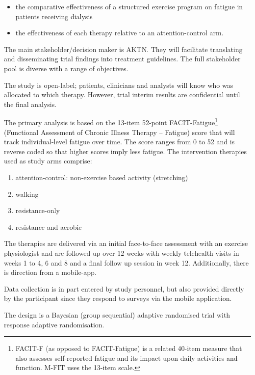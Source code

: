 \documentclass[11pt,parskip=half-]{scrartcl}
\providecommand{\tightlist}{%
  \setlength{\itemsep}{0pt}\setlength{\parskip}{0pt}}
\begin{document}
\begin{itemize}\tightlist
  \item the comparative effectiveness of a structured exercise program on fatigue in patients receiving dialysis
  \item the effectiveness of each therapy relative to an attention-control arm.
\end{itemize}

The main stakeholder/decision maker is AKTN. They will facilitate translating and disseminating trial findings into treatment guidelines. The full stakeholder pool is diverse with a range of objectives.

The study is open-label; patients, clinicians and analysts will know who was allocated to which therapy. However, trial interim results are confidential until the final analysis.

The primary analysis is based on the 13-item 52-point FACIT-Fatigue\footnote{FACIT-F (as opposed to FACIT-Fatigue) is a related 40-item measure that also assesses self-reported fatigue and its impact upon daily activities and function. M-FIT uses the 13-item scale.} (Functional Assessment of Chronic Illness Therapy – Fatigue) score that will track individual-level fatigue over time. The score ranges from 0 to 52 and is reverse coded so that higher scores imply less fatigue. The intervention therapies used as study arms comprise:

\begin{enumerate}\tightlist
  \item attention-control: non-exercise based activity (stretching)
  \item walking
  \item resistance-only
  \item resistance and aerobic
\end{enumerate}

The therapies are delivered via an initial face-to-face assessment with an exercise physiologist and are followed-up over 12 weeks with weekly telehealth visits in weeks 1 to 4, 6 and 8 and a final follow up session in week 12.
Additionally, there is direction from a mobile-app.

Data collection is in part entered by study personnel, but also provided directly by the participant since they respond to surveys via the mobile application.

The design is a Bayesian (group sequential) adaptive randomised trial with response adaptive randomisation.
\end{document}
